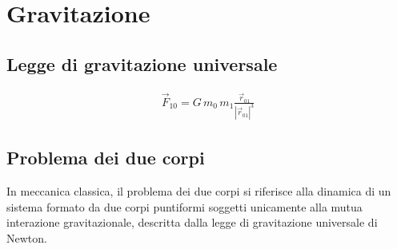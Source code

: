 \documentclass[letterpaper,10pt,italian]{jupyterBook}
\begin{document}
\section{Gravitazione}
\label{\detokenize{ch/mechanics/dynamics-motion-gravitation:gravitazione}}\label{\detokenize{ch/mechanics/dynamics-motion-gravitation:physics-hs-mechanics-dynamics-motion-gravitation}}\label{\detokenize{ch/mechanics/dynamics-motion-gravitation::doc}}



\subsection{Legge di gravitazione universale}
\label{\detokenize{ch/mechanics/dynamics-motion-gravitation:legge-di-gravitazione-universale}}\label{\detokenize{ch/mechanics/dynamics-motion-gravitation:physics-hs-mechanics-dynamics-motion-gravitation-newton}}\begin{equation*}
\begin{split}\vec{F}_{10} = G \, m_0 \, m_1 \frac{\vec{r}_{01}}{\left|\vec{r}_{01}\right|^3}\end{split}
\end{equation*}

\subsection{Problema dei due corpi}
\label{\detokenize{ch/mechanics/dynamics-motion-gravitation:problema-dei-due-corpi}}\label{\detokenize{ch/mechanics/dynamics-motion-gravitation:physics-hs-mechanics-dynamics-motion-gravitation-two-bodies}}
\sphinxAtStartPar
In meccanica classica, il problema dei due corpi si riferisce alla dinamica di un sistema formato da due corpi puntiformi soggetti unicamente alla mutua interazione gravitazionale, descritta dalla legge di gravitazione universale di Newton.
\end{document}
